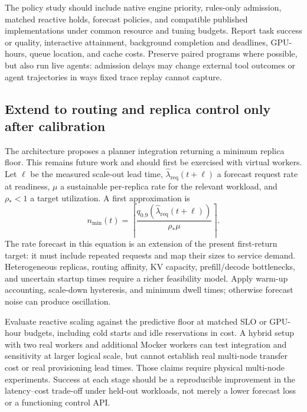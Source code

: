 \documentclass[11pt,a4paper]{article}
\begin{document}
The policy study should include native engine priority, rules-only admission, matched reactive holds, forecast policies, and compatible published implementations under common resource and tuning budgets. Report task success or quality, interactive attainment, background completion and deadlines, GPU-hours, queue location, and cache costs. Preserve paired programs where possible, but also run live agents: admission delays may change external tool outcomes or agent trajectories in ways fixed trace replay cannot capture.

\subsection{Extend to routing and replica control only after calibration}
The architecture proposes a planner integration returning a minimum replica floor. This remains future work and should first be exercised with virtual workers. Let \(\ell\) be the measured scale-out lead time, \(\widehat\lambda_{\mathrm{req}}(t+\ell)\) a forecast request rate at readiness, \(\mu\) a sustainable per-replica rate for the relevant workload, and \(\rho_*<1\) a target utilization. A first approximation is
\begin{equation}
n_{\min}(t)=\left\lceil\frac{q_{0.9}(\widehat\lambda_{\mathrm{req}}(t+\ell))}{\rho_*\mu}\right\rceil.
\label{eq:replica-floor}
\end{equation}
The rate forecast in this equation is an extension of the present first-return target: it must include repeated requests and map their sizes to service demand. Heterogeneous replicas, routing affinity, KV capacity, prefill/decode bottlenecks, and uncertain startup times require a richer feasibility model. Apply warm-up accounting, scale-down hysteresis, and minimum dwell times; otherwise forecast noise can produce oscillation.

Evaluate reactive scaling against the predictive floor at matched SLO or GPU-hour budgets, including cold starts and idle reservations in cost. A hybrid setup with two real workers and additional Mocker workers can test integration and sensitivity at larger logical scale, but cannot establish real multi-node transfer cost or real provisioning lead times. Those claims require physical multi-node experiments. Success at each stage should be a reproducible improvement in the latency--cost trade-off under held-out workloads, not merely a lower forecast loss or a functioning control API.


\end{document}

